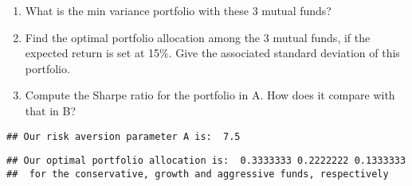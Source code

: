 \documentclass[11pt,]{article}
\newenvironment{Shaded}{\begin{snugshade}}{\end{snugshade}}
\newcommand{\CommentTok}[1]{\textcolor[rgb]{0.56,0.35,0.01}{\textit{#1}}}
\newcommand{\DataTypeTok}[1]{\textcolor[rgb]{0.13,0.29,0.53}{#1}}
\newcommand{\DecValTok}[1]{\textcolor[rgb]{0.00,0.00,0.81}{#1}}
\newcommand{\FloatTok}[1]{\textcolor[rgb]{0.00,0.00,0.81}{#1}}
\newcommand{\KeywordTok}[1]{\textcolor[rgb]{0.13,0.29,0.53}{\textbf{#1}}}
\newcommand{\NormalTok}[1]{#1}
\newcommand{\OperatorTok}[1]{\textcolor[rgb]{0.81,0.36,0.00}{\textbf{#1}}}
\newcommand{\StringTok}[1]{\textcolor[rgb]{0.31,0.60,0.02}{#1}}
\providecommand{\tightlist}{%
\setlength{\itemsep}{0pt}\setlength{\parskip}{0pt}}
\begin{document}
\begin{Shaded}
\end{Shaded}

\begin{enumerate}
\def\labelenumi{\arabic{enumi}.}
\tightlist
\item
  What is the min variance portfolio with these 3 mutual funds?
\item
  Find the optimal portfolio allocation among the 3 mutual funds, if the
  expected return is set at 15\%. Give the associated standard deviation
  of this portfolio.
\item
  Compute the Sharpe ratio for the portfolio in A. How does it compare
  with that in B?
\end{enumerate}

\begin{verbatim}
## Our risk aversion parameter A is:  7.5
\end{verbatim}

\begin{verbatim}
## Our optimal portfolio allocation is:  0.3333333 0.2222222 0.1333333 
##  for the conservative, growth and aggressive funds, respectively
\end{verbatim}
\end{document}
